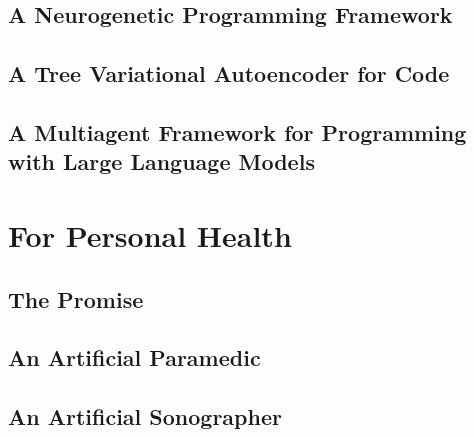 \newpage
\chapter{A Neurogenetic Programming Framework}


\newpage
\chapter{A Tree Variational Autoencoder for Code}\label{ch:autocode-autoenc}


\newpage
\chapter{A Multiagent Framework for Programming with Large Language Models}\label{ch:autocode-autoregr}


\part{For Personal Health}
\newpage
\chapter{The Promise} \label{ch:health-motiv}


%

\newpage
\chapter{An Artificial Paramedic} \label{ch:virtu-als}



\newpage
\chapter{An Artificial Sonographer} \label{ch:imagym}


